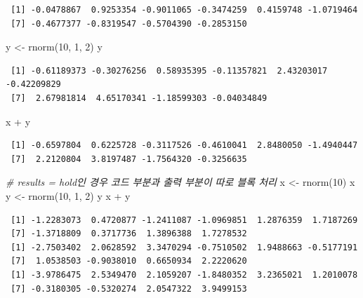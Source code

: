 \documentclass[
  11pt,
]{krantz}
\newenvironment{Shaded}{\begin{snugshade}}{\end{snugshade}}
\newcommand{\CommentTok}[1]{\textcolor[rgb]{0.37,0.37,0.37}{\textit{#1}}}
\newcommand{\DecValTok}[1]{\textcolor[rgb]{0.06,0.06,0.06}{#1}}
\newcommand{\FunctionTok}[1]{\textcolor[rgb]{0,0,0}{#1}}
\newcommand{\NormalTok}[1]{#1}
\newcommand{\OtherTok}[1]{\textcolor[rgb]{0.37,0.37,0.37}{#1}}
\newcommand{\SpecialCharTok}[1]{\textcolor[rgb]{0,0,0}{#1}}
\begin{document}
\begin{verbatim}
 [1] -0.0478867  0.9253354 -0.9011065 -0.3474259  0.4159748 -1.0719464
 [7] -0.4677377 -0.8319547 -0.5704390 -0.2853150
\end{verbatim}

\begin{Shaded}
\begin{Highlighting}[]
\NormalTok{y }\OtherTok{\textless{}{-}} \FunctionTok{rnorm}\NormalTok{(}\DecValTok{10}\NormalTok{, }\DecValTok{1}\NormalTok{, }\DecValTok{2}\NormalTok{)}
\NormalTok{y}
\end{Highlighting}
\end{Shaded}

\begin{verbatim}
 [1] -0.61189373 -0.30276256  0.58935395 -0.11357821  2.43203017 -0.42209829
 [7]  2.67981814  4.65170341 -1.18599303 -0.04034849
\end{verbatim}

\begin{Shaded}
\begin{Highlighting}[]
\NormalTok{x }\SpecialCharTok{+}\NormalTok{ y}
\end{Highlighting}
\end{Shaded}

\begin{verbatim}
 [1] -0.6597804  0.6225728 -0.3117526 -0.4610041  2.8480050 -1.4940447
 [7]  2.2120804  3.8197487 -1.7564320 -0.3256635
\end{verbatim}

\normalsize

\footnotesize

\begin{Shaded}
\begin{Highlighting}[]
\CommentTok{\# results = \textquotesingle{}hold\textquotesingle{}인 경우 코드 부분과 출력 부분이 따로 블록 처리}
\NormalTok{x }\OtherTok{\textless{}{-}} \FunctionTok{rnorm}\NormalTok{(}\DecValTok{10}\NormalTok{)}
\NormalTok{x}
\NormalTok{y }\OtherTok{\textless{}{-}} \FunctionTok{rnorm}\NormalTok{(}\DecValTok{10}\NormalTok{, }\DecValTok{1}\NormalTok{, }\DecValTok{2}\NormalTok{)}
\NormalTok{y}
\NormalTok{x }\SpecialCharTok{+}\NormalTok{ y}
\end{Highlighting}
\end{Shaded}

\begin{verbatim}
 [1] -1.2283073  0.4720877 -1.2411087 -1.0969851  1.2876359  1.7187269
 [7] -1.3718809  0.3717736  1.3896388  1.7278532
 [1] -2.7503402  2.0628592  3.3470294 -0.7510502  1.9488663 -0.5177191
 [7]  1.0538503 -0.9038010  0.6650934  2.2220620
 [1] -3.9786475  2.5349470  2.1059207 -1.8480352  3.2365021  1.2010078
 [7] -0.3180305 -0.5320274  2.0547322  3.9499153
\end{verbatim}
\end{document}
